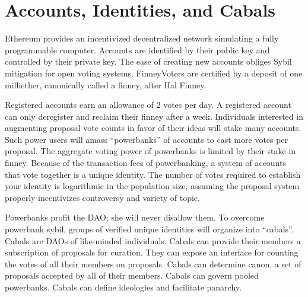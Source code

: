 \documentclass{article}
\begin{document}
\section{Accounts, Identities, and Cabals}
Ethereum provides an incentivized decentralized network simulating a fully programmable computer.
Accounts are identified by their public key and controlled by their private key.
The ease of creating new accounts obliges Sybil mitigation for open voting systems.
FinneyVoters are certified by a deposit of one milliether, canonically called a finney, after Hal Finney.
\par
Registered accounts earn an allowance of 2 votes per day.
A registered account can only deregister and reclaim their finney after a week.
Individuals interested in augmenting proposal vote counts in favor of their ideas will stake many accounts.
Such power users will amass ``powerbanks'' of accounts to cast more votes per proposal.
The aggregate voting power of powerbanks is limited by their stake in finney.
Because of the transaction fees of powerbanking, a system of accounts that vote together is a unique identity.
The number of votes required to establish your identity is logarithmic in the population size, assuming the proposal system properly incentivizes controversy and variety of topic.
\par
Powerbanks profit the DAO; she will never disallow them.
To overcome powerbank sybil, groups of verified unique identities will organize into ``cabals''.
Cabals are DAOs of like-minded individuals.
Cabals can provide their members a subscription of proposals for curation.
They can expose an interface for counting the votes of all their members on proposals.
Cabals can determine canon, a set of proposals accepted by all of their members.
Cabals can govern pooled powerbanks.
Cabals can define ideologies and facilitate panarchy.
\end{document}
